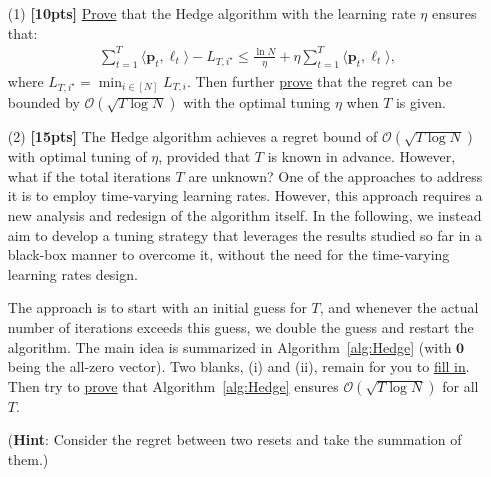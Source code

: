 \documentclass[a4paper]{article}
\numberwithin{equation}{section}
\theoremstyle{definition}
\newcommand\inner[2]{\langle #1, #2 \rangle}
\theoremstyle{definition}
\def \O {\mathcal{O}}
\def \p {\boldsymbol{p}}
\begin{document}
\begin{enumerate}
  \item[(1)] \textbf{[10pts]} \underline{Prove} that the Hedge algorithm with the learning rate $\eta$ ensures that:
  \begin{align*}
    \sum_{t=1}^T \inner{\p_t}{\boldsymbol{\ell}_t} - L_{T, i^\star} \leq \frac{\ln N}{\eta} + \eta \sum_{t=1}^T \langle \boldsymbol{p}_t, \boldsymbol{\ell}_t \rangle,
  \end{align*}
  where $L_{T, i^\star} = \min_{i\in[N]} L_{T, i}$. Then further \underline{prove} that the regret can be bounded by $\O(\sqrt{T\log N})$ with the optimal tuning $\eta$ when $T$ is given.
  \item[(2)] \textbf{[15pts]} The Hedge algorithm achieves a regret bound of $\O(\sqrt{T\log N})$ with optimal tuning of $\eta$, provided that $T$ is known in advance. However, what if the total iterations $T$ are unknown? One of the approaches to address it is to employ time-varying learning rates. However, this approach requires a new analysis and redesign of the algorithm itself. In the following, we instead aim to develop a tuning strategy that leverages the results studied so far in a black-box manner to overcome it, without the need for the time-varying learning rates design.
  
  The approach is to start with an initial guess for $T$, and whenever the actual number of iterations exceeds this guess, we double the guess and restart the algorithm. The main idea is summarized in Algorithm~\ref{alg:Hedge} (with $\textbf{0}$ being the all-zero vector). Two blanks, (i) and (ii), remain for you to \underline{fill in}. Then try to \underline{prove} that Algorithm~\ref{alg:Hedge} ensures $\O(\sqrt{T\log N})$ for all $T$. 
  
  (\textbf{Hint}: Consider the regret between two resets and take the summation of them.)
    

\end{enumerate}
\end{document}
